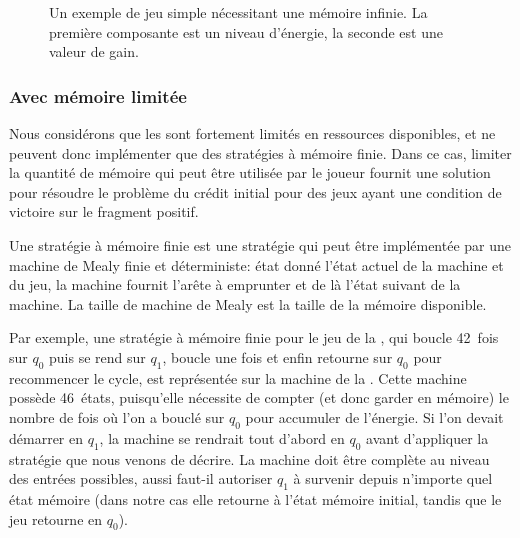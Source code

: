 \begin{figure}[ht]
\centering
{}
\caption[Un exemple de jeu simple nécessitant une mémoire infinie.]{Un exemple de jeu simple nécessitant une mémoire infinie. La première composante est un niveau d'énergie, la seconde est une valeur de gain.}%
\label{tj:fig:infmemoryneeded}
\end{figure}

\subsubsection{Avec mémoire limitée}

Nous considérons que les \wsns sont fortement limités en ressources disponibles, et ne peuvent donc implémenter que des stratégies à mémoire finie.
Dans ce cas, limiter \apriori la quantité de mémoire qui peut être utilisée par le joueur fournit une solution pour résoudre le problème du crédit initial pour des jeux ayant une condition de victoire sur le fragment positif.

Une stratégie à mémoire finie est une stratégie qui peut être implémentée par une machine de Mealy finie et déterministe: état donné l'état actuel de la machine et du jeu, la machine fournit l'arête à emprunter et de là l'état suivant de la machine.
La taille de machine de Mealy est la taille de la mémoire disponible.

Par exemple, une stratégie à mémoire finie pour le jeu de la , qui boucle 42~fois sur $q_0$ puis se rend sur $q_1$, boucle une fois et enfin retourne sur $q_0$ pour recommencer le cycle, est représentée sur la machine de la .
Cette machine possède 46~états, puisqu'elle nécessite de compter (et donc garder en mémoire) le nombre de fois où l'on a bouclé sur $q_0$ pour accumuler de l'énergie.
Si l'on devait démarrer en $q_1$, la machine se rendrait tout d'abord en $q_0$ avant d'appliquer la stratégie que nous venons de décrire.
La machine doit être complète au niveau des entrées possibles, aussi faut-il autoriser $q_1$ à survenir depuis n'importe quel état mémoire (dans notre cas elle retourne à l'état mémoire initial, tandis que le jeu retourne en $q_0$).

